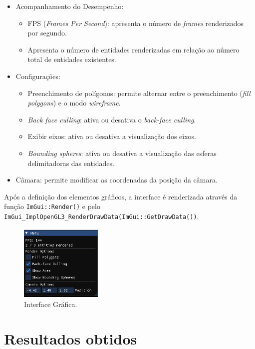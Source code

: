 \documentclass[12pt, a4paper]{article}
\begin{document}
\begin{itemize}
    \item Acompanhamento do Desempenho:
    \begin{itemize}
        \item FPS (\textit{Frames Per Second}): apresenta o número de \textit{frames}
        renderizados por segundo.
        \item Apresenta o número de entidades renderizadas em relação ao número total de entidades
        existentes.
    \end{itemize}
    \item Configurações:
    \begin{itemize}
        \item Preenchimento de polígonos: permite alternar entre o preenchimento
        (\textit{fill polygons}) e o modo \textit{wireframe}.
        \item \textit{Back face culling}: ativa ou desativa o \textit{back-face culling}.
        \item Exibir eixos: ativa ou desativa a visualização dos eixos.
        \item \textit{Bounding spheres}: ativa ou desativa a visualização das esferas delimitadoras
        das entidades.
    \end{itemize}
    \item Câmara: permite modificar as coordenadas da posição da câmara.
\end{itemize}

Após a definição dos elementos gráficos, a interface é renderizada através da função
\texttt{ImGui::Render()} e pelo \texttt{ImGui\_ImplOpenGL3\_RenderDrawData(ImGui::GetDrawData())}.

\begin{figure}[H]
    \centering
    \includegraphics[width=0.35\textwidth]{res/phase2/UI.png}
    \caption{Interface Gráfica.}
\end{figure}

\section{Resultados obtidos}
\end{document}

